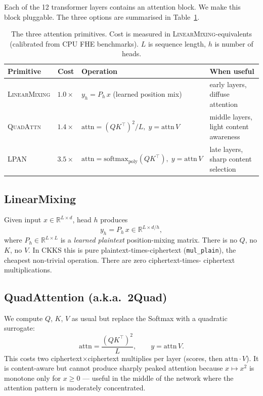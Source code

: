 \documentclass[11pt,a4paper]{article}
\newcommand{\LM}{\textsc{LinearMixing}}
\newcommand{\Quad}{\textsc{QuadAttn}}
\newcommand{\LPAN}{\textsc{LPAN}}
\begin{document}
Each of the 12 transformer layers contains an attention block. We
make this block pluggable. The three options are summarised in
Table~\ref{tab:primitives}.

\begin{table}[h]
\centering
\caption{The three attention primitives. Cost is measured in
\LM{}-equivalents (calibrated from CPU FHE benchmarks).
$L$ is sequence length, $h$ is number of heads.}
\label{tab:primitives}
\begin{tabular}{l c l l}
\toprule
\textbf{Primitive} & \textbf{Cost} & \textbf{Operation} & \textbf{When useful} \\
\midrule
\LM{}    & $1.0\times$ & $y_h = P_h \, x$ (learned position mix) &
  early layers, diffuse attention \\
\Quad{}  & $1.4\times$ & $\mathrm{attn} = (QK^\top)^2 / L,\; y = \mathrm{attn}\,V$ &
  middle layers, light content awareness \\
\LPAN{}  & $3.5\times$ & $\mathrm{attn} = \mathrm{softmax}_{\text{poly}}(QK^\top), \; y = \mathrm{attn}\,V$ &
  late layers, sharp content selection \\
\bottomrule
\end{tabular}
\end{table}

\subsection{LinearMixing}
Given input $x \in \mathbb{R}^{L \times d}$, head $h$ produces
\[
y_h = P_h \, x \in \mathbb{R}^{L \times d/h},
\]
where $P_h \in \mathbb{R}^{L \times L}$ is a \emph{learned plaintext}
position-mixing matrix. There is no $Q$, no $K$, no $V$. In CKKS
this is pure plaintext-times-ciphertext (\texttt{mul\_plain}), the
cheapest non-trivial operation. There are zero ciphertext-times-
ciphertext multiplications.

\subsection{QuadAttention (a.k.a.\ 2Quad)}
We compute $Q$, $K$, $V$ as usual but replace the Softmax with a
quadratic surrogate:
\[
\mathrm{attn} = \frac{(Q K^\top)^2}{L}, \qquad y = \mathrm{attn}\, V.
\]
This costs two ciphertext$\times$ciphertext multiplies per layer
(scores, then $\mathrm{attn}\cdot V$). It is content-aware but cannot
produce sharply peaked attention because $x \mapsto x^2$ is monotone
only for $x \ge 0$ — useful in the middle of the network where the
attention pattern is moderately concentrated.
\end{document}
